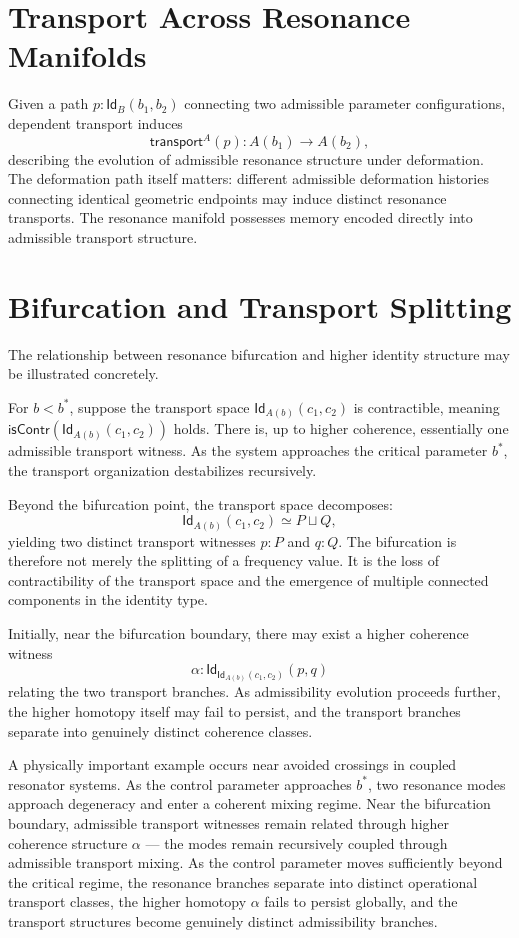 \documentclass[11pt,openany]{book}
\theoremstyle{definition}
\theoremstyle{plain}
\newcommand{\idtype}{\mathsf{Id}}
\newcommand{\transport}{\mathsf{transport}}
\begin{document}
\section{Transport Across Resonance Manifolds}

Given a path $p : \idtype_B(b_1,b_2)$ connecting two admissible parameter configurations, dependent transport induces
\[
\transport^A(p) : A(b_1) \to A(b_2),
\]
describing the evolution of admissible resonance structure under deformation. The deformation path itself matters: different admissible deformation histories connecting identical geometric endpoints may induce distinct resonance transports. The resonance manifold possesses memory encoded directly into admissible transport structure.

\section{Bifurcation and Transport Splitting}

The relationship between resonance bifurcation and higher identity structure may be illustrated concretely.

For $b < b^\ast$, suppose the transport space $\idtype_{A(b)}(c_1,c_2)$ is contractible, meaning $\mathsf{isContr}(\idtype_{A(b)}(c_1,c_2))$ holds. There is, up to higher coherence, essentially one admissible transport witness. As the system approaches the critical parameter $b^\ast$, the transport organization destabilizes recursively.

Beyond the bifurcation point, the transport space decomposes:
\[
\idtype_{A(b)}(c_1,c_2) \simeq P \sqcup Q,
\]
yielding two distinct transport witnesses $p : P$ and $q : Q$. The bifurcation is therefore not merely the splitting of a frequency value. It is the loss of contractibility of the transport space and the emergence of multiple connected components in the identity type.

Initially, near the bifurcation boundary, there may exist a higher coherence witness
\[
\alpha : \idtype_{\idtype_{A(b)}(c_1,c_2)}(p,q)
\]
relating the two transport branches. As admissibility evolution proceeds further, the higher homotopy itself may fail to persist, and the transport branches separate into genuinely distinct coherence classes.

A physically important example occurs near avoided crossings in coupled resonator systems. As the control parameter approaches $b^\ast$, two resonance modes approach degeneracy and enter a coherent mixing regime. Near the bifurcation boundary, admissible transport witnesses remain related through higher coherence structure $\alpha$ --- the modes remain recursively coupled through admissible transport mixing. As the control parameter moves sufficiently beyond the critical regime, the resonance branches separate into distinct operational transport classes, the higher homotopy $\alpha$ fails to persist globally, and the transport structures become genuinely distinct admissibility branches.
\end{document}
